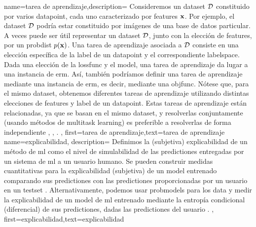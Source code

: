 {name={tarea de aprendizaje},description=
	{Consideremos un \gls{dataset} $\mathcal{D}$ constituido por varios \gls{datapoint}, cada uno 
	caracterizado por \gls{feature}s ${\bf x}$. Por ejemplo, el \gls{dataset} $\mathcal{D}$ 
	podría estar constituido por imágenes de una base de datos particular. A veces puede ser útil 
	 representar un \gls{dataset} $\mathcal{D}$, junto con la elección de \gls{feature}s, por un \gls{probdist} $p({\bf x})$. 
	 Una tarea de aprendizaje asociada a $\mathcal{D}$ consiste en una elección específica de la 
	 \gls{label} de un \gls{datapoint} y el correspondiente \gls{labelspace}. 
	 Dada una elección de la \gls{lossfunc} y el \gls{model}, una tarea de aprendizaje da lugar 
	 a una instancia de \gls{erm}. Así, también podríamos definir una tarea de aprendizaje mediante una instancia de \gls{erm}, es decir, 
	 mediante una \gls{objfunc}. Nótese que, para el mismo \gls{dataset}, obtenemos diferentes tareas de aprendizaje utilizando 
	 distintas elecciones de \gls{feature}s y \gls{label} de un \gls{datapoint}. Estas tareas de aprendizaje  
	 están relacionadas, ya que se basan en el mismo \gls{dataset}, y resolverlas conjuntamente 
	 (usando métodos de \gls{multitask learning}) es preferible a resolverlas de forma independiente \cite{Caruana:1997wk}, \cite{JungGaphLassoSPL}, \cite{CSGraphSelJournal}.
	 },
	first={tarea de aprendizaje},text={tarea de aprendizaje}
	}
{name={explicabilidad},
	description={
		Definimos la (subjetiva) explicabilidad de un método de \gls{ml}
		como el nivel de simulabilidad \cite{Colin:2022aa} de las \gls{prediction}es
		entregadas por un sistema de \gls{ml} a un usuario humano.
		Se pueden construir medidas cuantitativas para la explicabilidad (subjetiva) de un \gls{model} entrenado
		comparando sus \gls{prediction}es con las \gls{prediction}es proporcionadas por un usuario
		en un \gls{testset} \cite{Zhang:2024aa,Colin:2022aa}.
		Alternativamente, podemos usar \gls{probmodel}s para los \gls{data}
		y medir la explicabilidad de un \gls{model} de \gls{ml} entrenado mediante la entropía condicional
		(diferencial) de sus \gls{prediction}es, dadas las \gls{prediction}es del usuario \cite{JunXML2020,Chen2018}.
	},
	first={explicabilidad},text={explicabilidad}
}
	
